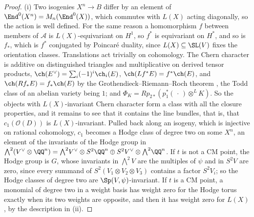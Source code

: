 \begin{proof}
(i) Two isogenies $X^{n}\to B$ differ by an element of $\End^{0}(X^{n})=
M_{n}(\End^{0}(X))$, which commutes with $L(X)$ acting diagonally, so the
action is well defined. For the same reason a homomorphism $f$ between members
of $\mathcal{A}$ is $L(X)$-equivariant on $H^{1}$, so $f^{*}$ is equivariant
on $H^{*}$, and so is $f_{*}$, which is $f^{*}$ conjugated by Poincar\'e
duality, since $L(X)\subseteq\SL(V)$ fixes the orientation classes.
Translations act trivially on cohomology. The Chern character is additive on
distinguished triangles and multiplicative on derived tensor products,
$\ch(E^{\vee})=\sum_{i}(-1)^{i}\ch_{i}(E)$, $\ch(Lf^{*}E)=f^{*}\ch(E)$, and
$\ch(Rf_{*}E)=f_{*}\ch(E)$ by the Grothendieck--Riemann--Roch theorem
\cite[Theorem~15.2]{Ful98}, the Todd class of an abelian variety being $1$;
and $\Phi_{K}=Rp_{2*}(p_{1}^{*}(\,\cdot\,)\otimes^{L}K)$. So the objects with
$L(X)$-invariant Chern character form a class with all the closure
properties, and it remains to see that it contains the line bundles, that is,
that $c_{1}(\mathcal{O}(D))$ is $L(X)$-invariant. Pulled back along an
isogeny, which is injective on rational cohomology, $c_{1}$ becomes a Hodge
class of degree two on some $X^{n}$, an element of the invariants of the
Hodge group in ${\textstyle\bigwedge^{2}}(V^{\vee}\otimes\QQ^{n})=
{\textstyle\bigwedge^{2}}V^{\vee}\otimes S^{2}\QQ^{n}\oplus S^{2}V^{\vee}
\otimes{\textstyle\bigwedge^{2}}\QQ^{n}$. If $t$ is not a CM point, the Hodge
group is $G$, whose invariants in ${\textstyle\bigwedge^{2}}V$ are the multiples of $\psi$
and in $S^{2}V$ are zero, since every summand of $S^{2}(V_{1}\otimes V_{2}
\otimes V_{3})$ contains a factor $S^{2}V_{i}$; so the Hodge classes of degree
two are $\Sp(V,\psi)$-invariant. If $t$ is a CM point, a monomial of degree two
in a weight basis has weight zero for the Hodge torus exactly when its two
weights are opposite, and then it has weight zero for $L(X)$, by the
description in (ii).


\end{proof}
